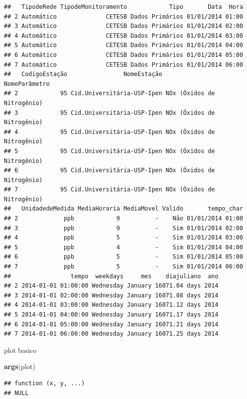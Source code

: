 \documentclass[]{book}
\newenvironment{Shaded}{\begin{snugshade}}{\end{snugshade}}
\newcommand{\KeywordTok}[1]{\textcolor[rgb]{0.13,0.29,0.53}{\textbf{#1}}}
\newcommand{\NormalTok}[1]{#1}
\begin{document}
\begin{verbatim}
##   TipodeRede TipodeMonitoramento            Tipo       Data  Hora
## 2 Automático              CETESB Dados Primários 01/01/2014 01:00
## 3 Automático              CETESB Dados Primários 01/01/2014 02:00
## 4 Automático              CETESB Dados Primários 01/01/2014 03:00
## 5 Automático              CETESB Dados Primários 01/01/2014 04:00
## 6 Automático              CETESB Dados Primários 01/01/2014 05:00
## 7 Automático              CETESB Dados Primários 01/01/2014 06:00
##   CodigoEstação                NomeEstação              NomeParâmetro
## 2            95 Cid.Universitária-USP-Ipen NOx (Óxidos de Nitrogênio)
## 3            95 Cid.Universitária-USP-Ipen NOx (Óxidos de Nitrogênio)
## 4            95 Cid.Universitária-USP-Ipen NOx (Óxidos de Nitrogênio)
## 5            95 Cid.Universitária-USP-Ipen NOx (Óxidos de Nitrogênio)
## 6            95 Cid.Universitária-USP-Ipen NOx (Óxidos de Nitrogênio)
## 7            95 Cid.Universitária-USP-Ipen NOx (Óxidos de Nitrogênio)
##   UnidadedeMedida MediaHoraria MediaMovel Valido       tempo_char
## 2             ppb            9          -    Não 01/01/2014 01:00
## 3             ppb            9          -    Sim 01/01/2014 02:00
## 4             ppb            5          -    Sim 01/01/2014 03:00
## 5             ppb            4          -    Sim 01/01/2014 04:00
## 6             ppb            5          -    Sim 01/01/2014 05:00
## 7             ppb            5          -    Sim 01/01/2014 06:00
##                 tempo  weekdays     mes    diajuliano  ano
## 2 2014-01-01 01:00:00 Wednesday January 16071.04 days 2014
## 3 2014-01-01 02:00:00 Wednesday January 16071.08 days 2014
## 4 2014-01-01 03:00:00 Wednesday January 16071.12 days 2014
## 5 2014-01-01 04:00:00 Wednesday January 16071.17 days 2014
## 6 2014-01-01 05:00:00 Wednesday January 16071.21 days 2014
## 7 2014-01-01 06:00:00 Wednesday January 16071.25 days 2014
\end{verbatim}

plot basico

\begin{Shaded}
\begin{Highlighting}[]
\KeywordTok{args}\NormalTok{(plot)}
\end{Highlighting}
\end{Shaded}

\begin{verbatim}
## function (x, y, ...) 
## NULL
\end{verbatim}
\end{document}
